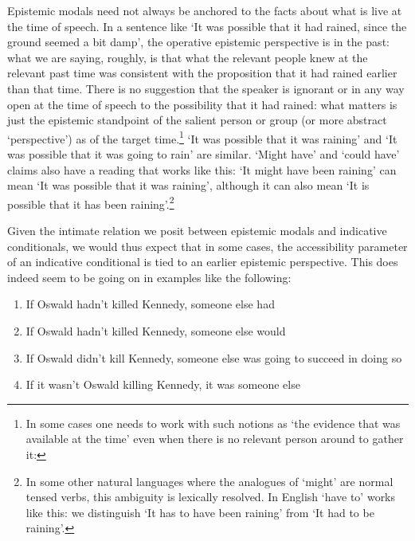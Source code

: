 Epistemic modals need not always be anchored to the facts about what is
live at the time of speech. In a sentence like `It was possible that it
had rained, since the ground seemed a bit damp', the operative epistemic
perspective is in the past: what we are saying, roughly, is that what
the relevant people knew at the relevant past time was consistent with
the proposition that it had rained earlier than that time. There is no
suggestion that the speaker is ignorant or in any way open at the time
of speech to the possibility that it had rained: what matters is just
the epistemic standpoint of the salient person or group (or more
abstract `perspective') as of the target time.\footnote{In some cases
  one needs to work with such notions as `the evidence that was
  available at the time' even when there is no relevant person around to
  gather it:} `It was possible that it was raining' and `It was possible
that it was going to rain' are similar. `Might have' and `could have'
claims also have a reading that works like this: `It might have been
raining' can mean `It was possible that it was raining', although it can
also mean `It is possible that it has been raining'.\footnote{In some
  other natural languages where the analogues of `might' are normal
  tensed verbs, this ambiguity is lexically resolved. In English `have
  to' works like this: we distinguish `It has to have been raining' from
  `It had to be raining'.}

Given the intimate relation we posit between epistemic modals and
indicative conditionals, we would thus expect that in some cases, the
accessibility parameter of an indicative conditional is tied to an
earlier epistemic perspective. This does indeed seem to be going on in
examples like the following:

\begin{enumerate}
\def\labelenumi{(\arabic{enumi})}
\setcounter{enumi}{8}
\item
  If Oswald hadn't killed Kennedy, someone else had
\item
  If Oswald hadn't killed Kennedy, someone else would
\item
  If Oswald didn't kill Kennedy, someone else was going to succeed in
  doing so
\item
  If it wasn't Oswald killing Kennedy, it was someone else
\end{enumerate}

